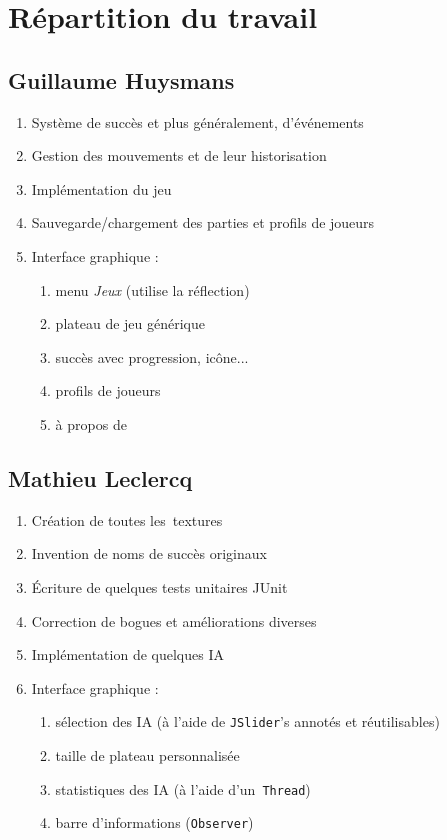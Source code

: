 \section{Répartition du travail}

\subsection{Guillaume Huysmans}
\begin{enumerate}
	\item Système de succès et plus généralement, d'événements
    \item Gestion des mouvements et de leur historisation
    \item Implémentation du jeu \oth
    \item Sauvegarde/chargement des parties et profils de joueurs
    \item Interface graphique :
    \begin{enumerate}
        \item menu \textit{Jeux} (utilise la réflection)
        \item plateau de jeu générique
        \item succès avec progression, icône...
        \item profils de joueurs
        \item à propos de
    \end{enumerate}
\end{enumerate}

\subsection{Mathieu Leclercq}
\begin{enumerate}
	\item Création de toutes les~textures
    \item Invention de noms de succès originaux
    \item Écriture de quelques tests unitaires JUnit
    \item Correction de bogues et améliorations diverses
    \item Implémentation de quelques IA
	\item Interface graphique : 
    \begin{enumerate}
        \item sélection des IA (à l'aide de \texttt{JSlider}'s annotés et réutilisables)
        \item taille de plateau personnalisée
        \item statistiques des IA (à l'aide d'un~\texttt{Thread})
        \item barre d'informations (\texttt{Observer})
    \end{enumerate}
\end{enumerate}
